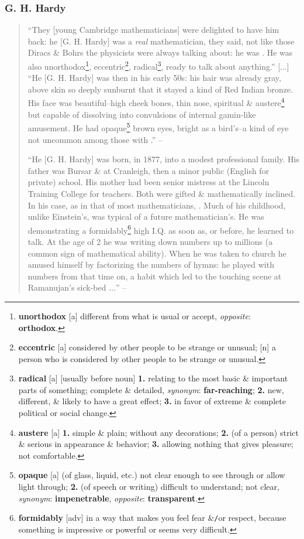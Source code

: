 \documentclass{article}
\numberwithin{equation}{section}
\begin{document}
\subsubsection{G. H. Hardy}
\begin{quotation}
	``They [young Cambridge mathematicians] were delighted to have him back: he [G. H. Hardy] was a \textit{real} mathematician, they said, not like those Diracs \& Bohrs the physicists were always talking about: he was . He was also unorthodox\footnote{\textbf{unorthodox} [a] different from what is usual or accept, \textit{opposite}: \textbf{orthodox}.}, eccentric\footnote{\textbf{eccentric} [a] considered by other people to be strange or unusual; [n] a person who is considered by other people to be strange or unusual.}, radical\footnote{\textbf{radical} [a] [usually before noun] \textbf{1.} relating to the most basic \& important parts of something; complete \& detailed, \textit{synonym}: \textbf{far-reaching}; \textbf{2.} new, different, \& likely to have a great effect; \textbf{3.} in favor of extreme \& complete political or social change.}, ready to talk about anything.'' [$\ldots$] ``He [G. H. Hardy] was then in his early 50s: his hair was already gray, above skin so deeply sunburnt that it stayed a kind of Red Indian bronze. His face was beautiful--high cheek bones, thin nose, spiritual \& austere\footnote{\textbf{austere} [a] \textbf{1.} simple \& plain; without any decorations; \textbf{2.} (of a person) strict \& serious in appearance \& behavior; \textbf{3.} allowing nothing that gives pleasure; not comfortable.} but capable of dissolving into convulsions of internal gamin-like amusement. He had opaque\footnote{\textbf{opaque} [a] (of glass, liquid, etc.) not clear enough to see through or allow light through; \textbf{2.} (of speech or writing) difficult to understand; not clear, \textit{synonym}: \textbf{impenetrable}, \textit{opposite}: \textbf{transparent}.} brown eyes, bright as a bird's--a kind of eye not uncommon among those with .'' -- \cite[Foreword, p. 9]{Hardy1992}
	
	``He [G. H. Hardy] was born, in 1877, into a modest professional family. His father was Bursar \&  at Cranleigh, then a minor public (English for private) school. His mother had been senior mistress at the Lincoln Training College for teachers. Both were gifted \& mathematically inclined. In his case, as in that of most mathematicians, . Much of his childhood, unlike Einstein's, was typical of a future mathematician's. He was demonstrating a formidably\footnote{\textbf{formidably} [adv] in a way that makes you feel fear \&\texttt{/}or respect, because something is impressive or powerful or seems very difficult.} high I.Q. as soon as, or before, he learned to talk. At the age of 2 he was writing down numbers up to millions (a common sign of mathematical ability). When he was taken to church he amused himself by factorizing the numbers of hymns: he played with numbers from that time on, a habit which led to the touching scene at Ramanujan's sick-bed $\ldots$''  -- \cite[Foreword, pp. 13--14]{Hardy1992}
	

\end{quotation}
\end{document}
